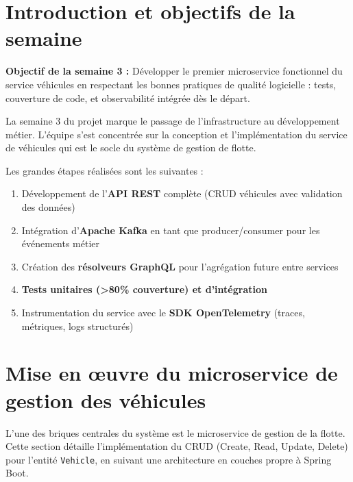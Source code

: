 \documentclass[12pt,a4paper]{article}
\begin{document}
\section{Introduction et objectifs de la semaine}

\begin{infobox}
\textbf{Objectif de la semaine 3 :} Développer le premier microservice fonctionnel du service véhicules en respectant les bonnes pratiques de
qualité logicielle : tests, couverture de code, et observabilité intégrée dès le départ.
\end{infobox}

\vspace{0.5cm}

La semaine 3 du projet marque le passage de l'infrastructure au développement métier.
L'équipe s'est concentrée sur la conception et l'implémentation du service de véhicules qui est le socle du système de gestion de flotte.

Les grandes étapes réalisées sont les suivantes :

\begin{enumerate}[leftmargin=*, label=\textbf{\arabic*.}]
  \item Développement de l'\textbf{API REST} complète (CRUD véhicules avec validation des données)
  \item Intégration d'\textbf{Apache Kafka} en tant que producer/consumer pour les événements métier
  \item Création des \textbf{résolveurs GraphQL} pour l'agrégation future entre services
  \item \textbf{Tests unitaires (>80\% couverture) et d’intégration}
  \item Instrumentation du service avec le \textbf{SDK OpenTelemetry} (traces, métriques, logs structurés)
\end{enumerate}

\newpage
\section{Mise en œuvre du microservice de gestion des véhicules}

L'une des briques centrales du système est le microservice de gestion de la flotte. Cette section détaille l'implémentation du CRUD (Create, Read, Update, Delete) pour l'entité \texttt{Vehicle}, en suivant une architecture en couches propre à Spring Boot.
\end{document}

